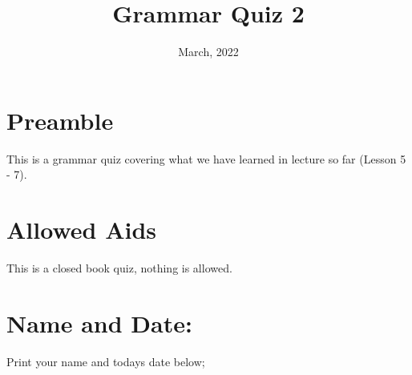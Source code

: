 \documentclass[12pt]{article} %
\title{Grammar Quiz 2}
\date{March, 2022}
\begin{document}
    \renewcommand*{\coursecode}{MCR3U Quiz} %
    \renewcommand*{\assgnnumber}{2} %
    \renewcommand*{\submdate}{January, 2022} %
    \renewcommand*{\studentfname}{\textbf{Name:}} %
    \renewcommand*{\studentlname}{} %

    \renewcommand\qedsymbol{$\blacksquare$}
    \setfigpath
    \pagestyle{crowdmark}
    \fancyhfoffset[L,O]{0pt} %




	\maketitle
	\section{Preamble}
  This is a grammar quiz covering what we have learned in lecture so far (Lesson 5 - 7).
	\section{Allowed Aids}
  This is a closed book quiz, nothing is allowed.
	\section{Name and Date:}
	Print your name and todays date below;
\end{document}
